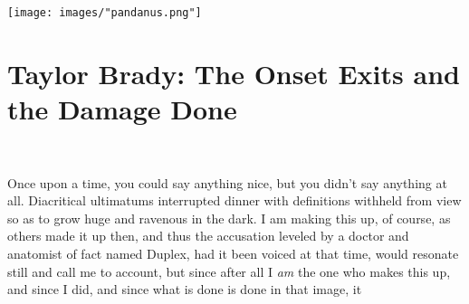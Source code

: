 \documentclass[
]{memoir}
\begin{document}
\begin{center}\texttt{[image: images/"pandanus.png"]}\end{center}

\hypertarget{taylor-brady-the-onset-exits-and-the-damage-done}{%
\chapter{Taylor Brady: The Onset Exits and the Damage
Done}\label{taylor-brady-the-onset-exits-and-the-damage-done}}

~

Once upon a time, you could say anything nice, but you didn't say
anything at all. Diacritical ultimatums interrupted dinner with
definitions withheld from view so as to grow huge and ravenous in the
dark. I am making this up, of course, as others made it up then, and
thus the accusation leveled by a doctor and anatomist of fact named
Duplex, had it been voiced at that time, would resonate still and call
me to account, but since after all I \emph{am} the one who makes this
up, and since I did, and since what is done is done in that image, it
\end{document}
